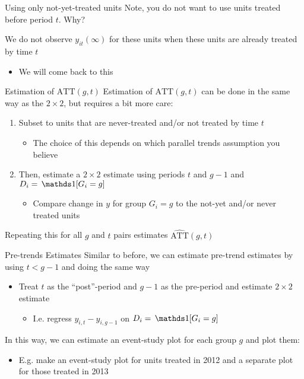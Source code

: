 \documentclass[aspectratio=169,t,11pt,table]{beamer}
\begin{document}
\begin{frame}{Using only not-yet-treated units}
  Note, you do not want to use units treated before period $t$. Why?

  \pause
  We do not observe $y_{it}(\infty)$ for these units when these units are already treated by time $t$
  \begin{itemize}
    \item We will come back to this
  \end{itemize}
\end{frame}

\begin{frame}{Estimation of $\text{ATT}(g,t)$}
  Estimation of $\text{ATT}(g,t)$ can be done in the same way as the $2 \times 2$, but requires a bit more care:

  \bigskip
  \begin{enumerate}
    \item Subset to units that are never-treated and/or not treated by time $t$ 
    \begin{itemize}
      \item The choice of this depends on which parallel trends assumption you believe
    \end{itemize}
 
    \item Then, estimate a $2 \times 2$ estimate using periods $t$ and $g - 1$ and $D_i = \one{G_i = g}$
    \begin{itemize}
      \item Compare change in $y$ for group $G_i = g$ to the not-yet and/or never treated units
    \end{itemize}
  \end{enumerate}

  \bigskip
  Repeating this for all $g$ and $t$ pairs estimates $\hat{\text{ATT}}(g, t)$
\end{frame}

\begin{frame}{Pre-trends Estimates}
  Similar to before, we can estimate pre-trend estimates by using $t < g - 1$ and doing the same way
  \begin{itemize}
    \item Treat $t$ as the ``post''-period and $g - 1$ as the pre-period and estimate $2 \times 2$ estimate
    \begin{itemize}
      \item I.e. regress $y_{i, t} - y_{i, g-1}$ on $D_i = \one{G_i = g}$
    \end{itemize}
  \end{itemize}

  \bigskip
  In this way, we can estimate an event-study plot for each group $g$ and plot them:
  \begin{itemize}
    \item E.g. make an event-study plot for units treated in 2012 and a separate plot for those treated in 2013
  \end{itemize}
\end{frame}
\end{document}
